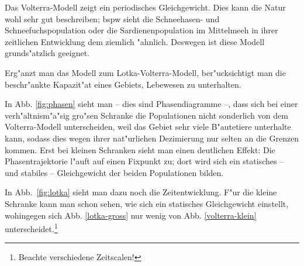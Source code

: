 \documentclass[a4paper,12pt]{article}
\newcommand{\abs}[0]{\bigskip\noindent}
\begin{document}
\abs Das Volterra-Modell zeigt ein periodisches Gleichgewicht. Dies
kann die Natur wohl sehr gut beschreiben; bspw sieht die Schneehasen-
und Schneefuchspopulation oder die Sardienenpopulation im Mittelmeeh
in ihrer zeitlichen Entwicklung dem ziemlich "ahnlich. Deswegen ist
diese Modell grunds"atzlich geeignet.

\abs
Erg"anzt man das Modell zum Lotka-Volterra-Modell, ber"ucksichtigt man
die beschr"ankte Kapazit"at eines Gebiets, Lebewesen zu unterhalten.

In Abb. \ref{fig:phasen} sieht man -- dies sind Phasendiagramme --,
dass sich bei einer verh"altnism"a"sig gro"sen Schranke die
Populationen nicht sonderlich von dem Volterra-Modell unterscheiden,
weil das Gebiet sehr viele B"autetiere unterhalte kann, sodass dies
wegen ihrer nat"urlichen Dezimierung nur selten an die Grenzen
kommen. Erst bei kleinen Schranken sieht man einen deutlichen Effekt:
Die Phasentrajektorie l"auft auf einen Fixpunkt zu; dort wird sich ein
statisches -- und stabiles -- Gleichgewicht der beiden Populationen
bilden.

In Abb.~\ref{fig:lotka} sieht man dazu noch die Zeitentwicklung. F"ur
die kleine Schranke kann man schon sehen, wie sich ein statisches
Gleichgewicht einstellt, wohingegen sich Abb. \ref{lotka-gross} nur
wenig von Abb. \ref{volterra-klein} unterscheidet.\footnote{Beachte
  verschiedene Zeitscalen!}
\end{document}

